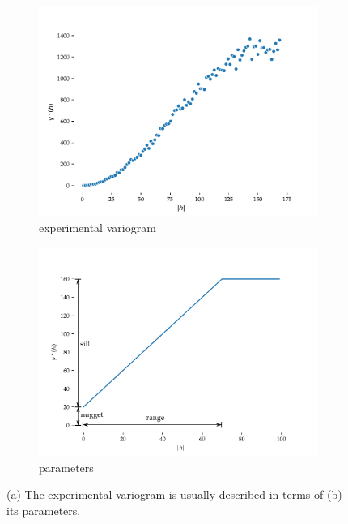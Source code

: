 \begin{figure}
\begin{subfigure}{0.5\linewidth}
\centering
\includegraphics[width=\linewidth]{figs/experimental_variogram}
\caption{experimental variogram}
\end{subfigure}%
\begin{subfigure}{0.5\linewidth}
\centering
\includegraphics[width=\linewidth]{figs/example_variogram}
\caption{parameters}
\end{subfigure}%
\caption{(a) The experimental variogram is usually described in terms of (b) its parameters.}%
\label{fig:experimental_variogram}
\end{figure}

